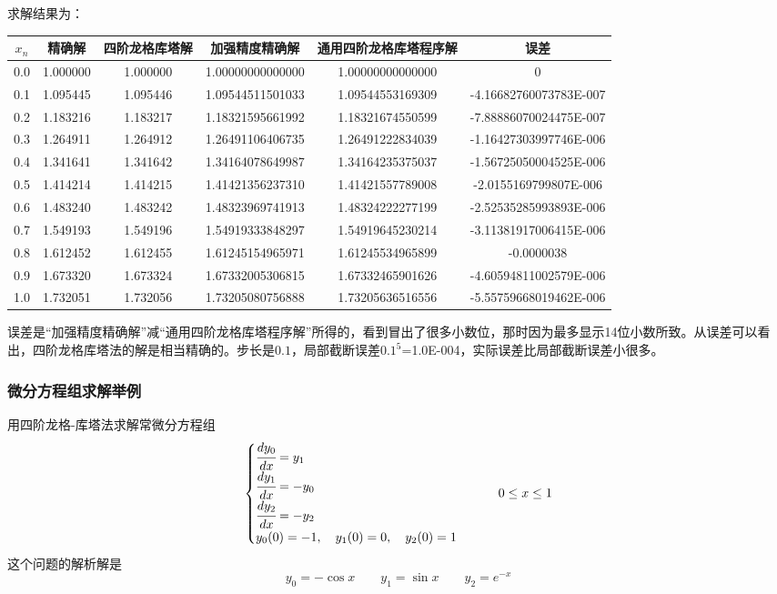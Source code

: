 
求解结果为：
{\small
\begin{center}
\begin{tabular}{c|c|c|c|c|c}
$x_n$  	&       精确解		  	& 四阶龙格库塔解		& 加强精度精确解	                 &通用四阶龙格库塔程序解	&	误差\\
\hline
 0.0  	&      1.000000       		&1.000000			&	1.00000000000000	&1.00000000000000		&	0\\
 0.1		&	1.095445 		&1.095446			&	1.09544511501033	&1.09544553169309		&	-4.16682760073783E-007\\
0.2		&	1.183216 		&1.183217			&	1.18321595661992	&1.18321674550599		&	-7.88886070024475E-007\\
0.3		&	1.264911 		&1.264912			&	1.26491106406735	&1.26491222834039		&	-1.16427303997746E-006\\
0.4		&	1.341641		&1.341642			&	1.34164078649987	&1.34164235375037		&	-1.56725050004525E-006\\
0.5		&	1.414214		&1.414215			&	1.41421356237310	&1.41421557789008		&	-2.0155169799807E-006\\
0.6		&	1.483240		&1.483242			&	1.48323969741913	&1.48324222277199		&	-2.52535285993893E-006\\
0.7		&	1.549193		&1.549196			&	1.54919333848297	&1.54919645230214		&	-3.11381917006415E-006\\
0.8		&	1.612452		&1.612455			&	1.61245154965971	&1.61245534965899		&	-0.0000038\\
0.9		&	1.673320		&1.673324			&	1.67332005306815	&1.67332465901626		&	-4.60594811002579E-006\\
1.0		&	1.732051		&1.732056			&	1.73205080756888	&1.73205636516556		&	-5.55759668019462E-006
\end{tabular}
\end{center}}
误差是“加强精度精确解”减“通用四阶龙格库塔程序解”所得的，看到冒出了很多小数位，那时因为最多显示14位小数所致。从误差可以看出，四阶龙格库塔法的解是相当精确的。步长是$0.1$，局部截断误差$0.1^5$=1.0E-004，实际误差比局部截断误差小很多。

\subsubsection{微分方程组求解举例}
用四阶龙格-库塔法求解常微分方程组
$$\begin{cases}
\cfrac{dy_0}{dx}=y_1\\
\cfrac{dy_1}{dx}=-y_0\\
\cfrac{dy_2}{dx}=-y_2\\
y_0(0)=-1,\quad y_1(0)=0,\quad y_2(0)=1
\end{cases}
\qquad 0\le x \le 1$$
这个问题的解析解是
$$y_0=-\cos x \qquad  y_1= \sin x  \qquad y_2 = e^{-x}$$


